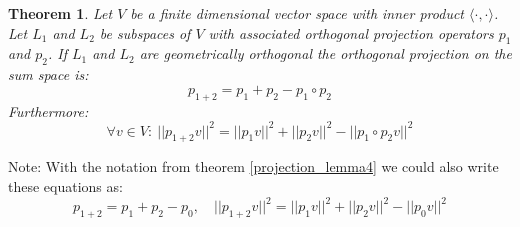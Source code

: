 \documentclass[12pt, a4paper]{article}
\newtheorem{theorem}{Theorem}[section]
\numberwithin{equation}{section}
\begin{document}
\begin{theorem}
\label{projection_lemma6}
Let $V$ be a finite dimensional vector space with inner product $\langle\cdot,\cdot\rangle$. Let $L_1$ and $L_2$ be subspaces of $V$ with associated orthogonal projection operators $p_1$ and $p_2$. If $L_1$ and $L_2$ are geometrically orthogonal the orthogonal projection on the sum space is:
\begin{equation}
p_{1+2}=p_1+p_2-p_1\circ p_2
\end{equation}
Furthermore:
\begin{equation}
\forall v\in V:\ ||p_{1+2}v||^2=||p_1 v||^2+||p_2 v||^2-||p_1\circ p_2 v||^2
\end{equation}
\end{theorem}
Note: With the notation from theorem \ref{projection_lemma4} we could also write these equations as:
\begin{equation}
p_{1+2}=p_1+p_2-p_0,\quad ||p_{1+2}v||^2=||p_1 v||^2+||p_2 v||^2-||p_0 v||^2
\end{equation}
\end{document}
